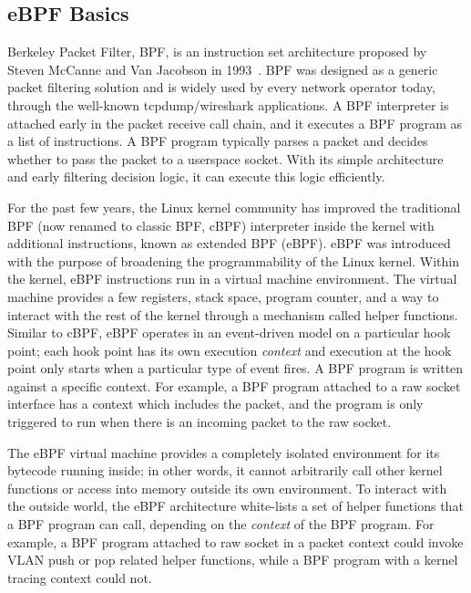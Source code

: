 \documentclass[10pt]{sigplanconf}
\begin{document}
\subsection{eBPF Basics}\label{sec:ebpf}
Berkeley Packet Filter, BPF, is an instruction set architecture
proposed by Steven McCanne and Van Jacobson in 1993~\cite{cbpf}.  
BPF was designed as a generic packet filtering solution and is widely
used by every network operator today, through the well-known tcpdump/wireshark
applications. A BPF interpreter is attached early in the packet receive call
chain, and it executes a BPF program as a list of instructions.
A BPF program typically parses a packet and decides
whether to pass the packet to a userspace socket.  With its simple architecture
and early filtering decision logic, it can execute this logic efficiently.

For the past few years, the Linux kernel community has improved the traditional
BPF (now renamed to classic BPF, cBPF) interpreter inside the kernel with
additional instructions, known as extended BPF (eBPF). eBPF was introduced with
the purpose of broadening the programmability of the Linux kernel. Within the
kernel, eBPF instructions run in a virtual machine environment. The virtual
machine provides a few registers, stack space, program counter, and a way to
interact with the rest of the kernel through a mechanism called helper
functions.  Similar to cBPF, eBPF operates in an event-driven model on a
particular hook point; each hook point has its own execution {\em context} and
execution at the hook point only starts when a particular type of event fires.
A BPF program is written against a specific context. For example, a BPF program
attached to a raw socket interface has a context which includes the packet, and
the program is only triggered to run when there is an incoming packet to the
raw socket.

The eBPF virtual machine provides a completely isolated environment for its
bytecode running inside; in other words, it cannot arbitrarily call other
kernel functions or access into memory outside its own environment. To interact
with the outside world, the eBPF architecture white-lists a set of helper
functions that a BPF program can call, depending on the {\em context} of the
BPF program.  For example, a BPF program attached to raw socket in a packet
context could invoke VLAN push or pop related helper functions, while a BPF
program with a kernel tracing context could not. %
\end{document}

